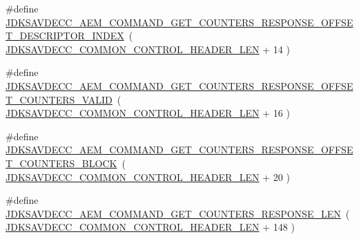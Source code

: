 \begin{DoxyCompactItemize}
\#define \hyperlink{group__command__get__counters__response_ga45974416971f70ce9a9d7531a38fb14b}{J\+D\+K\+S\+A\+V\+D\+E\+C\+C\+\_\+\+A\+E\+M\+\_\+\+C\+O\+M\+M\+A\+N\+D\+\_\+\+G\+E\+T\+\_\+\+C\+O\+U\+N\+T\+E\+R\+S\+\_\+\+R\+E\+S\+P\+O\+N\+S\+E\+\_\+\+O\+F\+F\+S\+E\+T\+\_\+\+D\+E\+S\+C\+R\+I\+P\+T\+O\+R\+\_\+\+I\+N\+D\+EX}~( \hyperlink{group__jdksavdecc__avtp__common__control__header_gaae84052886fb1bb42f3bc5f85b741dff}{J\+D\+K\+S\+A\+V\+D\+E\+C\+C\+\_\+\+C\+O\+M\+M\+O\+N\+\_\+\+C\+O\+N\+T\+R\+O\+L\+\_\+\+H\+E\+A\+D\+E\+R\+\_\+\+L\+EN} + 14 )
\item 
\#define \hyperlink{group__command__get__counters__response_ga94e811ce5fd6c5a604ede00e47e239d0}{J\+D\+K\+S\+A\+V\+D\+E\+C\+C\+\_\+\+A\+E\+M\+\_\+\+C\+O\+M\+M\+A\+N\+D\+\_\+\+G\+E\+T\+\_\+\+C\+O\+U\+N\+T\+E\+R\+S\+\_\+\+R\+E\+S\+P\+O\+N\+S\+E\+\_\+\+O\+F\+F\+S\+E\+T\+\_\+\+C\+O\+U\+N\+T\+E\+R\+S\+\_\+\+V\+A\+L\+ID}~( \hyperlink{group__jdksavdecc__avtp__common__control__header_gaae84052886fb1bb42f3bc5f85b741dff}{J\+D\+K\+S\+A\+V\+D\+E\+C\+C\+\_\+\+C\+O\+M\+M\+O\+N\+\_\+\+C\+O\+N\+T\+R\+O\+L\+\_\+\+H\+E\+A\+D\+E\+R\+\_\+\+L\+EN} + 16 )
\item 
\#define \hyperlink{group__command__get__counters__response_ga0131c648649b6d178126f8148d673f47}{J\+D\+K\+S\+A\+V\+D\+E\+C\+C\+\_\+\+A\+E\+M\+\_\+\+C\+O\+M\+M\+A\+N\+D\+\_\+\+G\+E\+T\+\_\+\+C\+O\+U\+N\+T\+E\+R\+S\+\_\+\+R\+E\+S\+P\+O\+N\+S\+E\+\_\+\+O\+F\+F\+S\+E\+T\+\_\+\+C\+O\+U\+N\+T\+E\+R\+S\+\_\+\+B\+L\+O\+CK}~( \hyperlink{group__jdksavdecc__avtp__common__control__header_gaae84052886fb1bb42f3bc5f85b741dff}{J\+D\+K\+S\+A\+V\+D\+E\+C\+C\+\_\+\+C\+O\+M\+M\+O\+N\+\_\+\+C\+O\+N\+T\+R\+O\+L\+\_\+\+H\+E\+A\+D\+E\+R\+\_\+\+L\+EN} + 20 )
\item 
\#define \hyperlink{group__command__get__counters__response_ga91839ce92b652148da54ec30062acdaf}{J\+D\+K\+S\+A\+V\+D\+E\+C\+C\+\_\+\+A\+E\+M\+\_\+\+C\+O\+M\+M\+A\+N\+D\+\_\+\+G\+E\+T\+\_\+\+C\+O\+U\+N\+T\+E\+R\+S\+\_\+\+R\+E\+S\+P\+O\+N\+S\+E\+\_\+\+L\+EN}~( \hyperlink{group__jdksavdecc__avtp__common__control__header_gaae84052886fb1bb42f3bc5f85b741dff}{J\+D\+K\+S\+A\+V\+D\+E\+C\+C\+\_\+\+C\+O\+M\+M\+O\+N\+\_\+\+C\+O\+N\+T\+R\+O\+L\+\_\+\+H\+E\+A\+D\+E\+R\+\_\+\+L\+EN} + 148 )
\end{DoxyCompactItemize}
